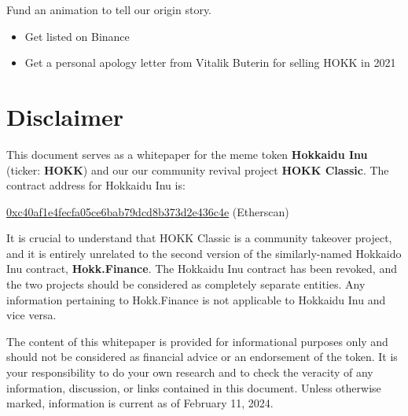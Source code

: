 \documentclass{article}
\begin{document}
\begin{tcolorbox}[colback=salmon1!10!white,colframe=salmon1,
  title=Phase 5: The King is Back,
  fonttitle=\bfseries]
  Fund an animation to tell our origin story.
\end{tcolorbox}
\begin{tcolorbox}[colback=salmon1!10!white,colframe=salmon1,
  title=Phase 6: Defeat Shiba Inu,
  fonttitle=\bfseries]
  \begin{itemize}
  \item Get listed on Binance
  \item Get a personal apology letter from Vitalik Buterin for selling HOKK in 2021
  \end{itemize}
\end{tcolorbox}

\newpage
\section{Disclaimer}
This document serves as a whitepaper for the meme token \textbf{Hokkaidu Inu} (ticker: \textbf{HOKK}) and our our community revival project \textbf{HOKK Classic}. The contract address for Hokkaidu Inu is:

\href{https://etherscan.io/token/0xc40af1e4fecfa05ce6bab79dcd8b373d2e436c4e}{0xc40af1e4fecfa05ce6bab79dcd8b373d2e436c4e} (Etherscan)

It is crucial to understand that HOKK Classic is a community takeover project, and it is entirely unrelated to the second version of the similarly-named Hokkaido Inu contract, \textbf{Hokk.Finance}. The Hokkaidu Inu contract has been revoked, and the two projects should be considered as completely separate entities. Any information pertaining to Hokk.Finance is not applicable to Hokkaidu Inu and vice versa.

The content of this whitepaper is provided for informational purposes only and should not be considered as financial advice or an endorsement of the token. It is your responsibility to do your own research and to check the veracity of any information, discussion, or links contained in this document. Unless otherwise marked, information is current as of February 11, 2024.
\end{document}
